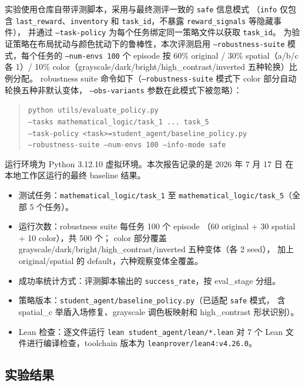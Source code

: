 \documentclass[12pt,a4paper]{ctexart}
\begin{document}
实验使用仓库自带评测脚本，采用与最终测评一致的 \texttt{safe} 信息模式
（\texttt{info} 仅包含 \texttt{last\_reward}、\texttt{inventory} 和
\texttt{task\_id}，不暴露 \texttt{reward\_signals} 等隐藏事件），
并通过 \texttt{--task-policy} 为每个任务绑定同一策略文件以获取 \texttt{task\_id}。
为验证策略在布局扰动与颜色扰动下的鲁棒性，本次评测启用
\texttt{--robustness-suite} 模式，每个任务的 \texttt{--num-envs 100} 个 episode
按 60\% original / 30\% spatial（a/b/c 各 1）/ 10\% color（grayscale/dark/bright/high\_contrast/inverted 五种轮换）比例分配。
robustness suite 命令如下（\texttt{--robustness-suite} 模式下 color 部分自动轮换五种非默认变体，
\texttt{--obs-variants} 参数在此模式下被忽略）：
\begin{quote}
\small
\texttt{python utils/evaluate\_policy.py}\\
\texttt{--tasks mathematical\_logic/task\_1 ... task\_5}\\
\texttt{--task-policy <task>=student\_agent/baseline\_policy.py}\\
\texttt{--robustness-suite --num-envs 100 --info-mode safe}
\end{quote}
运行环境为 Python 3.12.10 虚拟环境。本次报告记录的是 2026 年 7 月 17 日
在本地工作区运行的最终 baseline 结果。
\begin{itemize}[leftmargin=2em]
  \item 测试任务：\texttt{mathematical\_logic/task\_1} 至
  \texttt{mathematical\_logic/task\_5}（全部 5 个任务）。
  \item 运行次数：robustness suite 每任务 100 个 episode
  （60 original + 30 spatial + 10 color），共 500 个；
  color 部分覆盖 grayscale/dark/bright/high\_contrast/inverted 五种变体（各 2 seed），
  加上 original/spatial 的 default，六种观察变体全覆盖。
  \item 成功率统计方式：评测脚本输出的 \texttt{success\_rate}，按 eval\_stage 分组。
  \item 策略版本：\texttt{student\_agent/baseline\_policy.py}（已适配 \texttt{safe} 模式，
  含 spatial\_c 举盾入场修复、grayscale 调色板映射和 high\_contrast 形状识别）。
  \item Lean 检查：逐文件运行 \texttt{lean student\_agent/lean/*.lean}
  对 7 个 Lean 文件进行编译检查，toolchain 版本为 \texttt{leanprover/lean4:v4.26.0}。
\end{itemize}

\subsection{实验结果}
\end{document}
